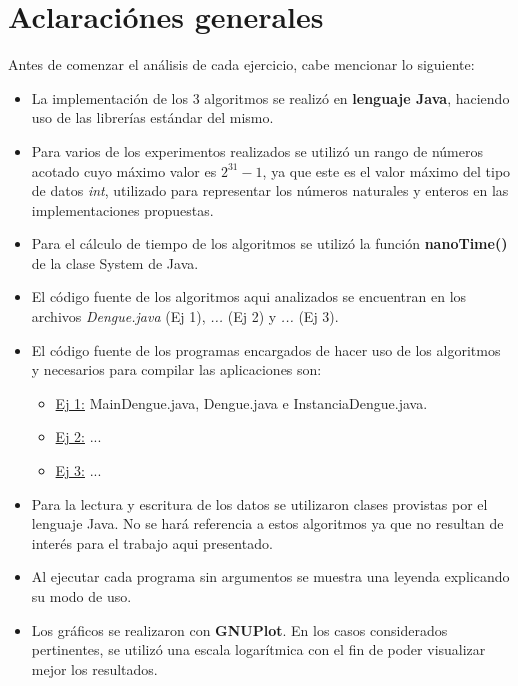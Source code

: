 \documentclass[a4paper,10pt] {article}
\begin{document}
\grupo{}

\maketitle

\bigskip
\section*{Aclaraci\'ones generales}

Antes de comenzar el an\'alisis de cada ejercicio, cabe mencionar lo siguiente:

\begin{itemize}
 \item La implementaci\'on de los 3 algoritmos se realizó en \textbf{lenguaje Java}, haciendo uso de las librer\'ias est\'andar del mismo.
 \item Para varios de los experimentos realizados se utiliz\'o un rango de n\'umeros acotado cuyo m\'aximo valor es $2^{31}-1$, ya que este es el valor m\'aximo del tipo de datos \textit{int}, utilizado para representar los n\'umeros naturales y enteros en las implementaciones propuestas.
 \item Para el c\'alculo de tiempo de los algoritmos se utiliz\'o la funci\'on \textbf{nanoTime()} de la clase System de Java.
 \item El c\'odigo fuente de los algoritmos aqui analizados se encuentran en los archivos \textit{Dengue.java} (Ej 1), \textit{...} (Ej 2) y \textit{...} (Ej 3).
 \item El c\'odigo fuente de los programas encargados de hacer uso de los algoritmos y necesarios para compilar las aplicaciones son:
 \begin{itemize}
    \item \underline{Ej 1:} MainDengue.java, Dengue.java e InstanciaDengue.java.
    \item \underline{Ej 2:} ...
    \item \underline{Ej 3:} ...
  \end{itemize}
 \item Para la lectura y escritura de los datos se utilizaron clases provistas por el lenguaje Java. No se har\'a referencia a estos algoritmos ya que no resultan de inter\'es para el trabajo aqui presentado.
 \item Al ejecutar cada programa sin argumentos se muestra una leyenda explicando su modo de uso.
 \item Los gr\'aficos se realizaron con \textbf{GNUPlot}. En los casos considerados pertinentes, se utiliz\'o una escala logar\'itmica con el fin de poder visualizar mejor los resultados.
\end{itemize}
\end{document}
